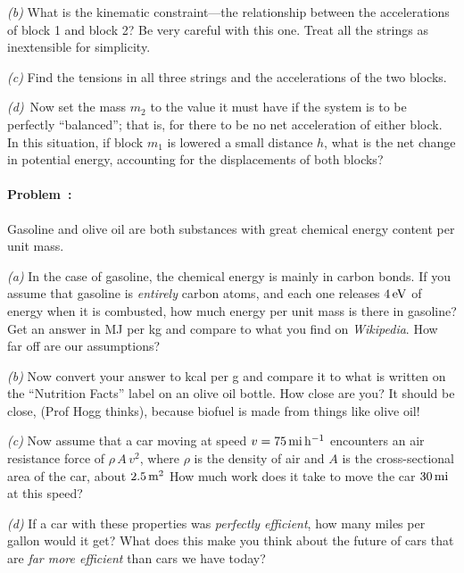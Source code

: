 \documentclass[12pt]{article}
\begin{document}
\textsl{(b)} What is the kinematic constraint---the relationship
between the accelerations of block 1 and block 2? Be very careful with
this one. Treat all the strings as inextensible for simplicity.

\textsl{(c)} Find the tensions in all three strings and the
accelerations of the two blocks.

\textsl{(d)}~Now set the mass $m_2$ to the value it must have if the
system is to be perfectly ``balanced''; that is, for there to be no
net acceleration of either block.  In this situation, if block $m_1$
is lowered a small distance $h$, what is the net change in potential
energy, accounting for the displacements of both blocks?

\paragraph{Problem~\theproblem:}%
Gasoline and olive oil are both substances with great chemical energy
content per unit mass.

\textsl{(a)} In the case of gasoline, the chemical energy is mainly in
carbon bonds.  If you assume that gasoline is \emph{entirely} carbon
atoms, and each one releases $4\,\mathrm{eV}$ of energy when it is combusted, how
much energy per unit mass is there in gasoline?  Get an answer in MJ
per kg and compare to what you find on \textit{Wikipedia}.  How far off
are our assumptions?

\textsl{(b)} Now convert your answer to kcal per g and compare it to
what is written on the ``Nutrition Facts'' label on an olive oil
bottle.  How close are you?  It should be close, (Prof Hogg thinks), because
biofuel is made from things like olive oil!

\textsl{(c)} Now assume that a car moving at speed
$v=75\,\mathrm{mi}\,\mathrm{h}^{-1}$ encounters an air resistance force of
$\rho\,A\,v^2$, where $\rho$ is the density of air and $A$ is the
cross-sectional area of the car, about $2.5\,\mathrm{m}^2$ How much work does it
take to move the car $30\,\mathrm{mi}$ at this speed?

\textsl{(d)} If a car with these properties was \emph{perfectly
  efficient}, how many miles per gallon would it get?  What does this
make you think about the future of cars that are \emph{far more
  efficient} than cars we have today?
\end{document}
